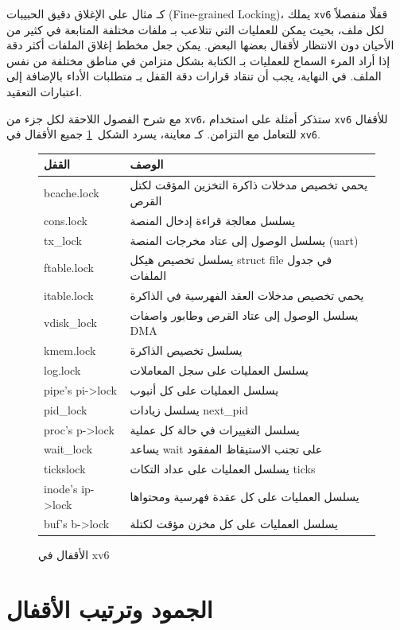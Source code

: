 كـ مثال على الإغلاق دقيق الحبيبات (Fine-grained Locking)، يملك \texttt{xv6} قفلًا منفصلاً لكل ملف، بحيث يمكن للعمليات التي تتلاعب بـ ملفات مختلفة المتابعة في كثير من الأحيان دون الانتظار لأقفال بعضها البعض.
يمكن جعل مخطط إغلاق الملفات أكثر دقة إذا أراد المرء السماح للعمليات بـ الكتابة بشكل متزامن في مناطق مختلفة من نفس الملف.
في النهاية، يجب أن تنقاد قرارات دقة القفل بـ متطلبات الأداء بالإضافة إلى اعتبارات التعقيد.

مع شرح الفصول اللاحقة لكل جزء من \texttt{xv6}، ستذكر أمثلة على استخدام \texttt{xv6} للأقفال للتعامل مع التزامن.
كـ معاينة، يسرد الشكل~\ref{fig:locktable} جميع الأقفال في \texttt{xv6}.

\begin{figure}[t]
\center
\begin{tabular}{ll}
{\bf القفل} & {\bf الوصف} \\
\midrule
bcache.lock & يحمي تخصيص مدخلات ذاكرة التخزين المؤقت لكتل القرص \\
cons.lock & يسلسل معالجة قراءة إدخال المنصة \\
tx\_lock & يسلسل الوصول إلى عتاد مخرجات المنصة (uart) \\
ftable.lock & يسلسل تخصيص هيكل struct file في جدول الملفات \\
itable.lock & يحمي تخصيص مدخلات العقد الفهرسية في الذاكرة \\
vdisk\_lock & يسلسل الوصول إلى عتاد القرص وطابور واصفات DMA \\
kmem.lock & يسلسل تخصيص الذاكرة \\
log.lock & يسلسل العمليات على سجل المعاملات \\
pipe's pi->lock & يسلسل العمليات على كل أنبوب \\
pid\_lock & يسلسل زيادات next\_pid \\
proc's p->lock & يسلسل التغييرات في حالة كل عملية \\
wait\_lock & يساعد wait على تجنب الاستيقاظ المفقود \\
tickslock & يسلسل العمليات على عداد التكات ticks \\
inode's ip->lock & يسلسل العمليات على كل عقدة فهرسية ومحتواها \\
buf's b->lock & يسلسل العمليات على كل مخزن مؤقت لكتلة \\
\end{tabular}
\caption{الأقفال في xv6}
\label{fig:locktable}
\end{figure}

\section{الجمود وترتيب الأقفال}
\label{sec:deadlock_lock_ordering}

